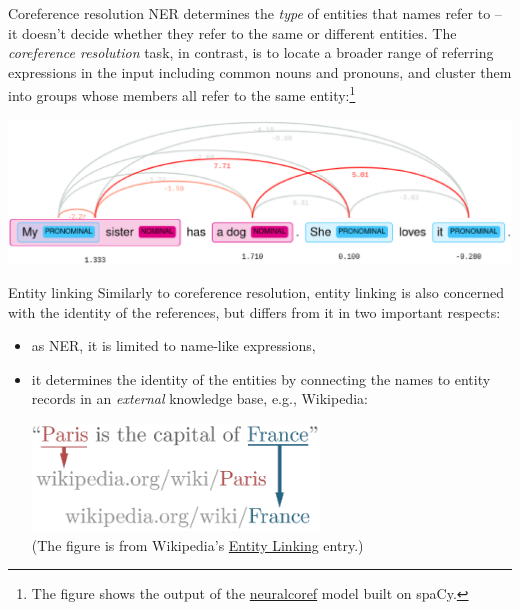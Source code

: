 \documentclass[style=upen, size=14pt]{powerdot}
\newcommand{\gold}{\color{arany}}
\begin{document}
\begin{slide}[toc=Coreference resolution]{Coreference resolution}
  NER determines the \emph{type} of entities that names refer to -- it doesn't
  decide whether they refer to the same or different entities. The \emph{\gold
    coreference resolution} task, in contrast, is to locate a broader range of
  referring expressions in the input including common nouns and pronouns, and
  cluster them into groups whose members all refer to the same
  entity:\footnote{The figure shows the output of the
    \href{https://spacy.io/universe/project/neuralcoref}{neuralcoref} model
    built on spaCy.}

  \includegraphics[width=1\textwidth]{figures/coref.eps}
\end{slide}

\begin{slide}[toc=Entity linking]{Entity linking}
  Similarly to coreference resolution, entity linking is also concerned with the
  identity of the references, but differs from it in two important respects:
  \begin{itemize}
  \item as \textsc{NER}, it is limited to name-like expressions,
  \item it determines the identity of the entities by connecting the
    names to entity records in an \emph{external} knowledge base, e.g.,
    Wikipedia:
  \begin{center}
    \includegraphics[width=0.6\textwidth]{figures/Entity_Linking.eps}\\
    \footnotesize{(The figure is from Wikipedia's \href{https://en.wikipedia.org/wiki/Entity_linking}{Entity Linking} entry.)}
\end{center}
\end{itemize}
\end{slide}
\end{document}
